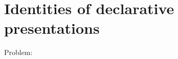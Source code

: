 \documentclass{article}
\begin{document}
\section{Identities of declarative presentations}

Problem:
\end{document}
